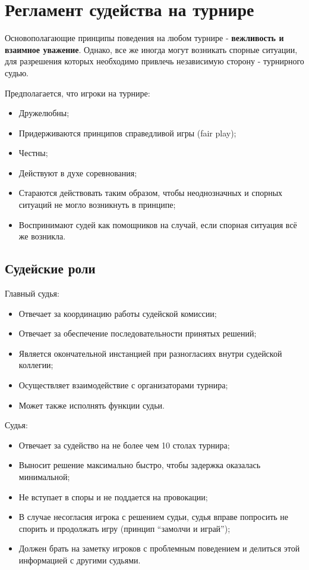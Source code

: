 \section{Регламент судейства на турнире}

Основополагающие принципы поведения на любом турнире - \textbf{вежливость и взаимное уважение}. Однако, все же иногда могут возникать спорные ситуации, для разрешения которых необходимо привлечь независимую сторону - турнирного судью.

Предполагается, что игроки на турнире:
\begin{itemize}
	\item Дружелюбны;
	\item Придерживаются принципов справедливой игры (fair play);
	\item Честны;
	\item Действуют в духе соревнования;
	\item Стараются действовать таким образом, чтобы неоднозначных и спорных ситуаций не могло возникнуть в принципе;
	\item Воспринимают судей как помощников на случай, если спорная ситуация всё же возникла.
\end{itemize}

\subsection{Судейские роли}

Главный судья:
\begin{itemize}
	\item Отвечает за координацию работы судейской комиссии;
	\item Отвечает за обеспечение последовательности принятых решений;
	\item Является окончательной инстанцией при разногласиях внутри судейской коллегии;
	\item Осуществляет взаимодействие с организаторами турнира;
	\item Может также исполнять функции судьи.
\end{itemize}

Судья:
\begin{itemize}
	\item Отвечает за судейство на не более чем 10 столах турнира;
	\item Выносит решение максимально быстро, чтобы задержка оказалась минимальной;
	\item Не вступает в споры и не поддается на провокации;
	\item В случае несогласия игрока с решением судьи, судья вправе попросить не спорить и продолжать игру (принцип “замолчи и играй”);
	\item Должен брать на заметку игроков с проблемным поведением и делиться этой информацией с другими судьями.
\end{itemize}

